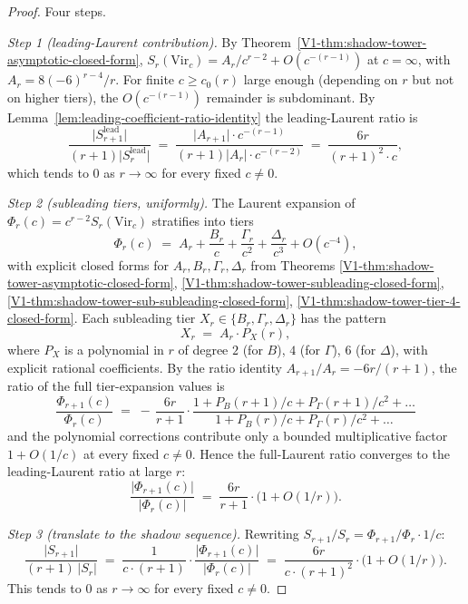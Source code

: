 \begin{proof}
Four steps.

\emph{Step 1 (leading-Laurent contribution).} By
Theorem~\ref{V1-thm:shadow-tower-asymptotic-closed-form},
$S_r(\mathrm{Vir}_c) = A_r / c^{r-2} + O(c^{-(r-1)})$ at $c = \infty$,
with $A_r = 8 (-6)^{r-4} / r$. For finite $c \ge c_0(r)$ large enough
(depending on $r$ but not on higher tiers), the $O(c^{-(r-1)})$
remainder is subdominant. By Lemma~\ref{lem:leading-coefficient-ratio-identity}
the leading-Laurent ratio is
\[
 \frac{\lvert S_{r+1}^{\mathrm{lead}} \rvert}
 {(r+1) \lvert S_r^{\mathrm{lead}} \rvert}
 \;=\;
 \frac{\lvert A_{r+1} \rvert \cdot c^{-(r-1)}}
 {(r+1) \lvert A_r \rvert \cdot c^{-(r-2)}}
 \;=\;
 \frac{6 r}{(r+1)^2 \cdot c},
\]
which tends to $0$ as $r \to \infty$ for every fixed $c \neq 0$.

\emph{Step 2 (subleading tiers, uniformly).} The Laurent expansion of
$\Phi_r(c) = c^{r-2} S_r(\mathrm{Vir}_c)$ stratifies into tiers
\[
 \Phi_r(c) \;=\; A_r + \frac{B_r}{c} + \frac{\Gamma_r}{c^2} +
 \frac{\Delta_r}{c^3} + O(c^{-4}),
\]
with explicit closed forms for $A_r, B_r, \Gamma_r, \Delta_r$ from
Theorems \ref{V1-thm:shadow-tower-asymptotic-closed-form},
\ref{V1-thm:shadow-tower-subleading-closed-form},
\ref{V1-thm:shadow-tower-sub-subleading-closed-form},
\ref{V1-thm:shadow-tower-tier-4-closed-form}. Each subleading tier
$X_r \in \{B_r, \Gamma_r, \Delta_r\}$ has the pattern
\[
 X_r \;=\; A_r \cdot P_X(r),
\]
where $P_X$ is a polynomial in $r$ of degree $2$ (for $B$), $4$ (for
$\Gamma$), $6$ (for $\Delta$), with explicit rational coefficients. By
the ratio identity
$A_{r+1} / A_r = -6 r / (r+1)$, the ratio of the full tier-expansion
values is
\[
 \frac{\Phi_{r+1}(c)}{\Phi_r(c)}
 \;=\;
 -\,\frac{6 r}{r+1}
 \cdot
 \frac{1 + P_B(r+1)/c + P_\Gamma(r+1)/c^2 + \ldots}
 {1 + P_B(r)/c + P_\Gamma(r)/c^2 + \ldots}
\]
and the polynomial corrections contribute only a bounded
multiplicative factor $1 + O(1/c)$ at every fixed $c \neq 0$. Hence
the full-Laurent ratio converges to the leading-Laurent ratio at large
$r$:
\[
 \frac{\lvert \Phi_{r+1}(c) \rvert}{\lvert \Phi_r(c) \rvert}
 \;=\;
 \frac{6 r}{r+1}
 \cdot \bigl(1 + O(1/r)\bigr).
\]

\emph{Step 3 (translate to the shadow sequence).} Rewriting
$S_{r+1} / S_r = \Phi_{r+1} / \Phi_r \cdot 1/c$:
\[
 \frac{\lvert S_{r+1} \rvert}{(r+1)\,\lvert S_r \rvert}
 \;=\;
 \frac{1}{c \cdot (r+1)} \cdot
 \frac{\lvert \Phi_{r+1}(c) \rvert}{\lvert \Phi_r(c) \rvert}
 \;=\;
 \frac{6 r}{c \cdot (r+1)^2}
 \cdot \bigl(1 + O(1/r)\bigr).
\]
This tends to $0$ as $r \to \infty$ for every fixed $c \neq 0$.


\end{proof}
